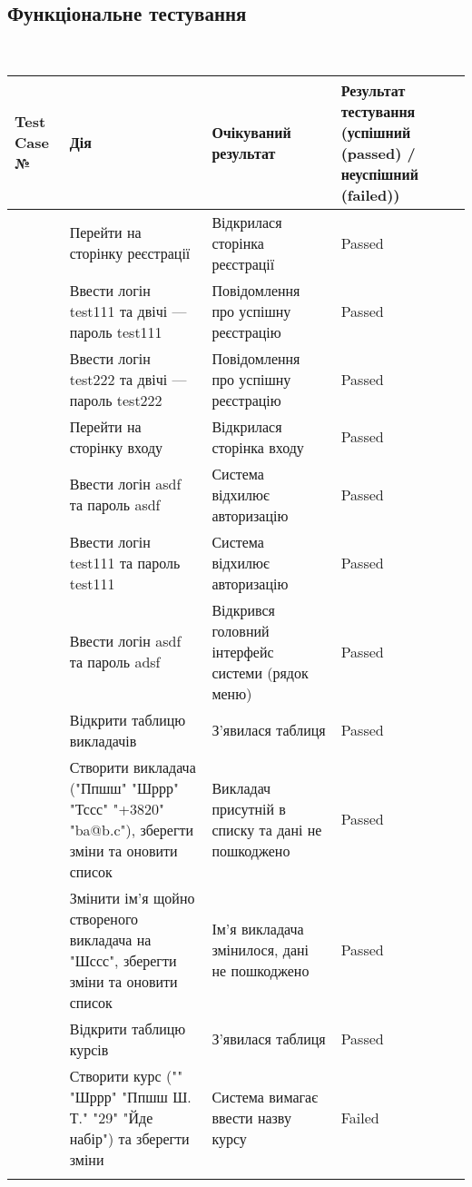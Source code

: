 \subsection{Функціональне тестування}
\\
\def\tcn{\addtocounter{tcnt}{1} \thetcnt}
\tablefirsthead{}
\tablelasttail{}
\tabletail{\hline}
\begin{supertabular}{|p{13mm}|p{65mm}|p{45mm}|p{3cm}|}
\hline
\textbf{Test Case №} &
\textbf{Дія} &
\textbf{Очікуваний результат} &
\textbf{Результат тестування (успішний (passed) / неуспішний (failed))} \\
\hline \tcn
& Перейти на сторінку реєстрації
& Відкрилася сторінка реєстрації
& Passed
\\ \hline \tcn
& Ввести логін test111 та двічі --- пароль test111
& Повідомлення про успішну реєстрацію
& Passed
\\ \hline \tcn
& Ввести логін test222 та двічі --- пароль test222
& Повідомлення про успішну реєстрацію
& Passed
\\ \hline \tcn
& Перейти на сторінку входу
& Відкрилася сторінка входу
& Passed
\\ \hline \tcn
& Ввести логін asdf та пароль asdf
& Система відхилює авторизацію
& Passed
\\ \hline \tcn
& Ввести логін test111 та пароль test111
& Система відхилює авторизацію
& Passed
\\ \hline \tcn
& Ввести логін asdf та пароль adsf
& Відкрився головний інтерфейс системи (рядок меню)
& Passed
\\ \hline \tcn
& Відкрити таблицю викладачів
& З'явилася таблиця
& Passed
\\ \hline \tcn
& Створити викладача ("Ппшш" "Шррр" "Тссс" "+3820" "ba@b.c"), зберегти зміни та оновити список
& Викладач присутній в списку та дані не пошкоджено
& Passed
\\ \hline \tcn
& Змінити ім'я щойно створеного викладача на "Шссс", зберегти зміни та оновити список
& Ім'я викладача змінилося, дані не пошкоджено
& Passed
\\ \hline \tcn
& Відкрити таблицю курсів
& З'явилася таблиця
& Passed
\\ \hline \tcn
& Створити курс ("" "Шррр" "Ппшш Ш. Т." "29" "Йде набір") та зберегти зміни
& Система вимагає ввести назву курсу
& Failed
\\ \hline \tcn

\end{supertabular}
